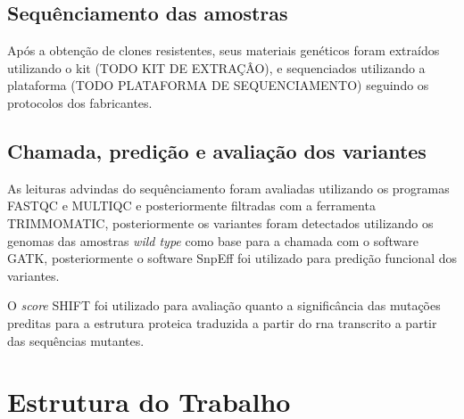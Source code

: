 \subsection{Sequênciamento das amostras}

Após a obtenção de clones resistentes, seus materiais genéticos foram extraídos utilizando o kit (TODO KIT DE EXTRAÇÂO), e sequenciados utilizando a plataforma (TODO PLATAFORMA DE SEQUENCIAMENTO) seguindo os protocolos dos fabricantes.

\subsection{Chamada, predição e avaliação dos variantes}

As leituras advindas do sequênciamento foram avaliadas utilizando os programas FASTQC e MULTIQC e posteriormente filtradas com a ferramenta TRIMMOMATIC, posteriormente
os variantes foram detectados utilizando os genomas das amostras \textit{wild type} como base para a chamada com o software GATK, posteriormente o software SnpEff foi utilizado para predição funcional dos variantes. 

O \textit{score} SHIFT foi utilizado para avaliação quanto a significância das mutações preditas para a estrutura proteica traduzida a partir do rna transcrito a partir das sequências mutantes.


\section{Estrutura do Trabalho}



